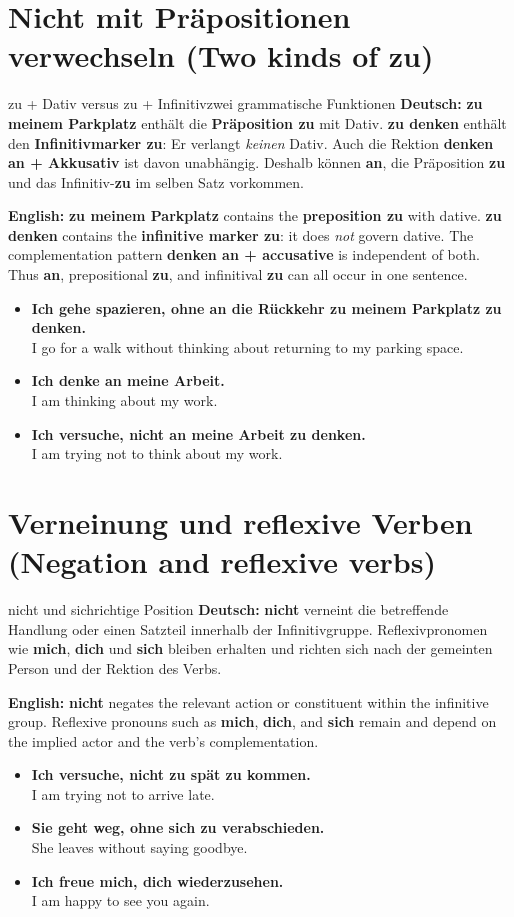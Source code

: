 \documentclass[a4paper,11pt]{article}
\newcommand{\GermanText}[1]{\textbf{Deutsch: }#1\par}
\newcommand{\EnglishText}[1]{{\small\color{SoftGray}\textbf{English: }#1\par}}
\newcommand{\ExampleItem}[2]{\item \textbf{#1}\\{\small\color{SoftGray}#2}}
\begin{document}
\section{Nicht mit Präpositionen verwechseln \textnormal{(Two kinds of zu)}}
\begin{grammarentry}{zu + Dativ versus zu + Infinitiv}{zwei grammatische Funktionen}
\GermanText{\textbf{zu meinem Parkplatz} enthält die \textbf{Präposition zu} mit Dativ. \textbf{zu denken} enthält den \textbf{Infinitivmarker zu}: Er verlangt \emph{keinen} Dativ. Auch die Rektion \textbf{denken an + Akkusativ} ist davon unabhängig. Deshalb können \textbf{an}, die Präposition \textbf{zu} und das Infinitiv-\textbf{zu} im selben Satz vorkommen.}
\EnglishText{\textbf{zu meinem Parkplatz} contains the \textbf{preposition zu} with dative. \textbf{zu denken} contains the \textbf{infinitive marker zu}: it does \emph{not} govern dative. The complementation pattern \textbf{denken an + accusative} is independent of both. Thus \textbf{an}, prepositional \textbf{zu}, and infinitival \textbf{zu} can all occur in one sentence.}
\end{grammarentry}
\begin{exbox}\begin{itemize}
\ExampleItem{Ich gehe spazieren, ohne an die Rückkehr zu meinem Parkplatz zu denken.}{I go for a walk without thinking about returning to my parking space.}
\ExampleItem{Ich denke an meine Arbeit.}{I am thinking about my work.}
\ExampleItem{Ich versuche, nicht an meine Arbeit zu denken.}{I am trying not to think about my work.}
\end{itemize}\end{exbox}

\section{Verneinung und reflexive Verben \textnormal{(Negation and reflexive verbs)}}
\begin{grammarentry}{nicht und sich}{richtige Position}
\GermanText{\textbf{nicht} verneint die betreffende Handlung oder einen Satzteil innerhalb der Infinitivgruppe. Reflexivpronomen wie \textbf{mich}, \textbf{dich} und \textbf{sich} bleiben erhalten und richten sich nach der gemeinten Person und der Rektion des Verbs.}
\EnglishText{\textbf{nicht} negates the relevant action or constituent within the infinitive group. Reflexive pronouns such as \textbf{mich}, \textbf{dich}, and \textbf{sich} remain and depend on the implied actor and the verb's complementation.}
\end{grammarentry}
\begin{exbox}\begin{itemize}
\ExampleItem{Ich versuche, nicht zu spät zu kommen.}{I am trying not to arrive late.}
\ExampleItem{Sie geht weg, ohne sich zu verabschieden.}{She leaves without saying goodbye.}
\ExampleItem{Ich freue mich, dich wiederzusehen.}{I am happy to see you again.}
\end{itemize}\end{exbox}
\end{document}
